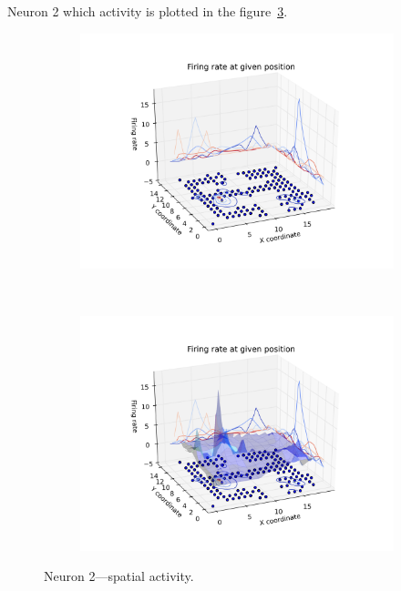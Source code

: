 \documentclass[12pt,a4paper,twocolumn]{article}
\begin{document}
Neuron 2 which activity is plotted in the figure~\ref{fig:3d_n2}.\\

\begin{figure}[htbp]
  \begin{subfigure}{.99\linewidth}\centering
    \includegraphics[width=1.1\textwidth]{figure7_a.png}
    \caption{\label{fig:3d_n2_a}}
  \end{subfigure}\\[1ex]
  \begin{subfigure}{.99\linewidth}\centering
    \includegraphics[width=1.1\textwidth]{figure7_b.png}
    \caption{\label{fig:3d_n2_b}}
  \end{subfigure}

  \caption{Neuron 2---spatial activity.\label{fig:3d_n2}}
\end{figure}
\end{document}

